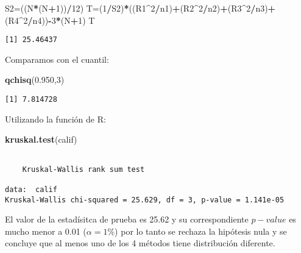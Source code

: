 \documentclass[
  a4paper,
  oneside,
  openany]{book}
\newenvironment{Shaded}{\begin{snugshade}}{\end{snugshade}}
\newcommand{\DecValTok}[1]{\textcolor[rgb]{0.00,0.00,0.81}{#1}}
\newcommand{\FloatTok}[1]{\textcolor[rgb]{0.00,0.00,0.81}{#1}}
\newcommand{\FunctionTok}[1]{\textcolor[rgb]{0.13,0.29,0.53}{\textbf{#1}}}
\newcommand{\NormalTok}[1]{#1}
\newcommand{\OtherTok}[1]{\textcolor[rgb]{0.56,0.35,0.01}{#1}}
\newcommand{\SpecialCharTok}[1]{\textcolor[rgb]{0.81,0.36,0.00}{\textbf{#1}}}
\begin{document}
\begin{Shaded}
\begin{Highlighting}[]
\NormalTok{S2}\OtherTok{=}\NormalTok{((N}\SpecialCharTok{*}\NormalTok{(N}\SpecialCharTok{+}\DecValTok{1}\NormalTok{))}\SpecialCharTok{/}\DecValTok{12}\NormalTok{)}
\NormalTok{T}\OtherTok{=}\NormalTok{(}\DecValTok{1}\SpecialCharTok{/}\NormalTok{S2)}\SpecialCharTok{*}\NormalTok{((R1}\SpecialCharTok{\^{}}\DecValTok{2}\SpecialCharTok{/}\NormalTok{n1)}\SpecialCharTok{+}\NormalTok{(R2}\SpecialCharTok{\^{}}\DecValTok{2}\SpecialCharTok{/}\NormalTok{n2)}\SpecialCharTok{+}\NormalTok{(R3}\SpecialCharTok{\^{}}\DecValTok{2}\SpecialCharTok{/}\NormalTok{n3)}\SpecialCharTok{+}\NormalTok{(R4}\SpecialCharTok{\^{}}\DecValTok{2}\SpecialCharTok{/}\NormalTok{n4))}\SpecialCharTok{{-}}\DecValTok{3}\SpecialCharTok{*}\NormalTok{(N}\SpecialCharTok{+}\DecValTok{1}\NormalTok{)}
\NormalTok{T}
\end{Highlighting}
\end{Shaded}

\begin{verbatim}
[1] 25.46437
\end{verbatim}

Comparamos con el cuantil:

\begin{Shaded}
\begin{Highlighting}[]
\FunctionTok{qchisq}\NormalTok{(}\FloatTok{0.950}\NormalTok{,}\DecValTok{3}\NormalTok{)}
\end{Highlighting}
\end{Shaded}

\begin{verbatim}
[1] 7.814728
\end{verbatim}

Utilizando la función de R:

\begin{Shaded}
\begin{Highlighting}[]
\FunctionTok{kruskal.test}\NormalTok{(calif)}
\end{Highlighting}
\end{Shaded}

\begin{verbatim}

    Kruskal-Wallis rank sum test

data:  calif
Kruskal-Wallis chi-squared = 25.629, df = 3, p-value = 1.141e-05
\end{verbatim}

El valor de la estadísitca de prueba es 25.62 y su correspondiente \(p-value\) es mucho menor a 0.01
(\(\alpha=1\%\)) por lo tanto se rechaza la hipótesis nula y se concluye que al menos uno de los 4 métodos tiene distribución diferente.
\end{document}
